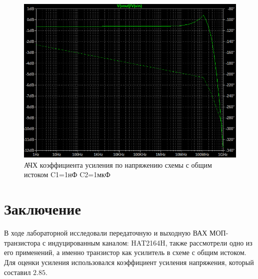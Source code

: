 \begin{figure}[H]
    \centering
    \includegraphics[width=0.8\linewidth]{figs/ачх_c1_1n_c2_1u.png}
    \caption{АЧХ коэффициента усиления по напряжению схемы с общим истоком C1=1нФ C2=1мкФ}
    \label{fig:ачх2}
\end{figure}

\section*{Заключение}

В ходе лабораторной исследовали передаточную и выходную ВАХ МОП-транзистора с 
индуцированным каналом: HAT2164H, 
также рассмотрели одно из его применений, а именно транзистор как
усилитель в схеме с общим истоком. Для оценки усиления использовался коэффициент 
усиления напряжения, который составил $2.85$.

